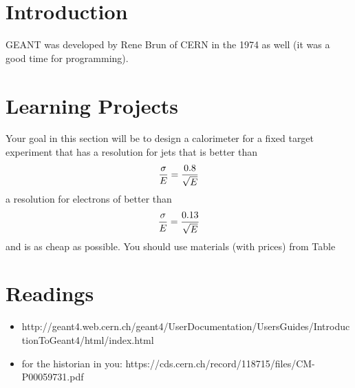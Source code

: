 \section{Introduction}
GEANT was developed by Rene Brun of CERN in the 1974 as well (it was a good time for programming).


\section{Learning Projects}
Your goal in this section will be to design a calorimeter for a fixed target experiment that has a resolution for jets that is better than
$$
{\sigma \over E} = {0.8 \over \sqrt{E}}
$$
a resolution for electrons of better than
$$
{\sigma \over E} = {0.13 \over \sqrt{E}}
$$
and is as cheap as possible.  You should use materials (with prices)
from Table 




\section{Readings}
\begin{itemize}
\item http://geant4.web.cern.ch/geant4/UserDocumentation/UsersGuides/IntroductionToGeant4/html/index.html
  \item for the historian in you: https://cds.cern.ch/record/118715/files/CM-P00059731.pdf
\end{itemize}

